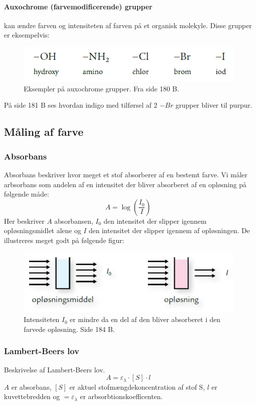 \paragraph{Auxochrome (farvemodificerende) grupper} kan ændre farven og intensiteten af farven på et organisk molekyle. 
Disse grupper er eksempelvis:
\begin{figure}[h]
    \centering
    \includegraphics[scale=.7]{Figurer/auxochromeGrupper}
    \caption{Eksempler på auxochrome grupper. Fra side 180 B.}
\end{figure}
På side 181 B ses hvordan indigo med tilførsel af 2 $-Br$ grupper bliver til purpur.


\subsection{Måling af farve}
\subsubsection{Absorbans}
Absorbans beskriver hvor meget et stof absorberer af en bestemt farve.
Vi måler arbsorbans som andelen af en intensitet der bliver absorberet af en opløsning på følgende måde:
$$A=\log(\frac{I_0}{I})$$
Her beskriver $A$ absorbansen, $I_0$ den intensitet der slipper igennem opløsningsmidlet alene og $I$ den intensitet der slipper igennem af opløsningen.
De illustreres meget godt på følgende figur:
\begin{figure}[h]
    \centering
    \includegraphics[scale=0.4]{Figurer/intensitet}
    \caption{Intensiteten $I_0$ er mindre da en del af den bliver absorberet i den farvede opløsning. Side 184 B.}
\end{figure}

\subsubsection{Lambert-Beers lov}
Beskrivelse af Lambert-Beers lov. 
$$ A= \varepsilon_\lambda \cdot [S] \cdot l  $$
$A$ er absorbans, $[S]$ er aktuel stofmængdekoncentration af stof S, $l$ er kuvettebredden og $= \varepsilon_\lambda$ er arbsorbtionskoefficenten.

